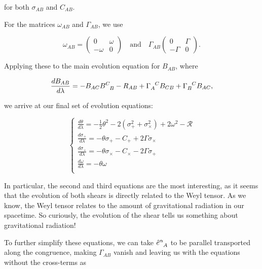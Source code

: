 \documentclass[twoside, openright]{RadboudReport}
\begin{document}
for both $\sigma_{AB}$ and $C_{AB}$.
\newpage

For the matrices $\omega_{AB}$ and $\Gamma_{AB}$, we use

\begin{equation*}
	\omega_{AB} = 
	\begin{pmatrix}
		0 & \omega \\
		-\omega & 0 
	\end{pmatrix}
	\quad \text{and} \quad
	\Gamma_{AB}
	\begin{pmatrix}
		0 & \Gamma \\
		-\Gamma & 0 
	\end{pmatrix}.
\end{equation*}

Applying these to the main evolution equation for $B_{AB}$, where

\begin{equation*}
	\frac{dB_{AB}}{d\lambda} = -B_{AC}B^C_{\hphantom{C}B} - R_{AB} + \Gamma_A^{\hphantom{A}C}B_{CB}+\Gamma_B^{\hphantom{B}C}B_{AC},
\end{equation*}

we arrive at our final set of evolution equations:

\begin{equation}
	\begin{cases}
		\frac{d\theta}{d\lambda} = -\frac{1}{2}\theta^2 - 2(\sigma_+^2 + \sigma_\times^2) + 2\omega^2 - \mathscr{R} \\
		\frac{d\sigma_+}{d\lambda} = -\theta\sigma_+ - C_+ + 2\Gamma\sigma_\times\\
		\frac{d\sigma_\times}{d\lambda} = -\theta\sigma_\times - C_\times - 2\Gamma\sigma_+\\
		\frac{d\omega}{d\lambda} = -\theta\omega\\
	\end{cases}
	\label{eq:evolutioneqs}
\end{equation}

In particular, the second and third equations are the most interesting, as it seems that the evolution of both shears is directly related to the Weyl tensor. As we know, the Weyl tensor relates to the amount of gravitational radiation in our spacetime. So curiously, the evolution of the shear tells us something about gravitational radiation! \newline 

To further simplify these equations, we can take $\hat{e}^\alpha_{\hphantom{\alpha}A}$ to be parallel transported along the congruence, making $\Gamma_{AB}$ vanish and leaving us with the equations without the cross-terms as
\end{document}
